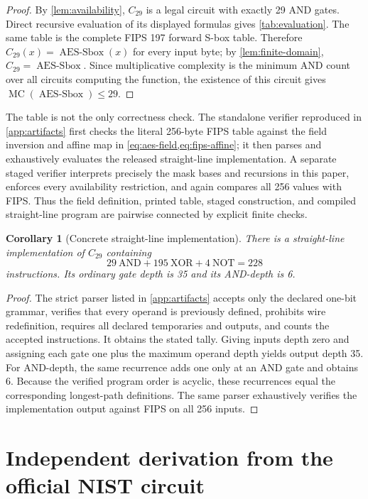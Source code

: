 \documentclass[11pt]{article}
\newtheorem{corollary}[corollary]{Corollary}
\theoremstyle{definition}
\newcommand{\AES}{\operatorname{AES\mbox{-}Sbox}}
\newcommand{\MC}{\operatorname{MC}}
\begin{document}
\begin{proof}
By \cref{lem:availability}, \(C_{29}\) is a legal circuit with exactly 29 AND gates.  Direct recursive
evaluation of its displayed formulas gives \cref{tab:evaluation}.  The same table is the complete
FIPS 197 forward S-box table.  Therefore \(C_{29}(x)=\AES(x)\) for every input byte; by
\cref{lem:finite-domain}, \(C_{29}=\AES\).  Since multiplicative complexity is the minimum AND count
over all circuits computing the function, the existence of this circuit gives
\(\MC(\AES)\leq29\).
\end{proof}

The table is not the only correctness check.  The standalone verifier reproduced in
\cref{app:artifacts} first checks the literal 256-byte FIPS table against the field inversion and
affine map in \cref{eq:aes-field,eq:fips-affine}; it then parses and exhaustively evaluates the
released straight-line implementation.  A separate staged verifier interprets precisely the mask
bases and recursions in this paper, enforces every availability restriction, and again compares all
256 values with FIPS.  Thus the field definition, printed table, staged construction, and compiled
straight-line program are pairwise connected by explicit finite checks.

\begin{corollary}[Concrete straight-line implementation]
\label{cor:slp}
There is a straight-line implementation of \(C_{29}\) containing
\[
 29\ \mathrm{AND}+195\ \mathrm{XOR}+4\ \mathrm{NOT}=228
\]
instructions.  Its ordinary gate depth is 35 and its AND-depth is 6.
\end{corollary}

\begin{proof}
The strict parser listed in \cref{app:artifacts} accepts only the declared one-bit grammar, verifies
that every operand is previously defined, prohibits wire redefinition, requires all declared
temporaries and outputs, and counts the accepted instructions.  It obtains the stated tally.  Giving
inputs depth zero and assigning each gate one plus the maximum operand depth yields output depth 35.
For AND-depth, the same recurrence adds one only at an AND gate and obtains 6.  Because the verified
program order is acyclic, these recurrences equal the corresponding longest-path definitions.  The
same parser exhaustively verifies the implementation output against FIPS on all 256 inputs.
\end{proof}

\section{Independent derivation from the official NIST circuit}
\label{sec:baseline}
\end{document}
